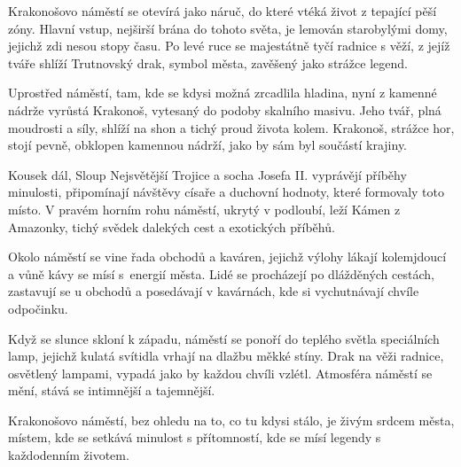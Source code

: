 \documentclass{article}
\begin{document}
	Krakonošovo náměstí se otevírá jako náruč, do které vtéká život z tepající pěší zóny. Hlavní vstup, nejširší brána do tohoto světa, je lemován starobylými domy, jejichž zdi nesou stopy času.
	Po levé ruce se majestátně tyčí radnice s věží, z jejíž tváře shlíží Trutnovský drak, symbol města, zavěšený jako strážce legend. \par
	Uprostřed náměstí, tam, kde se kdysi možná zrcadlila hladina, nyní z kamenné nádrže vyrůstá Krakonoš, vytesaný do podoby skalního masivu.
	Jeho tvář, plná moudrosti a síly, shlíží na shon a tichý proud života kolem. Krakonoš, strážce hor, stojí pevně, obklopen kamennou nádrží, jako by sám byl součástí krajiny. \par
	Kousek dál, Sloup Nejsvětější Trojice a socha Josefa II. vyprávějí příběhy minulosti, připomínají návštěvy císaře a duchovní hodnoty, které formovaly toto místo.
	V pravém horním rohu náměstí, ukrytý v podloubí, leží Kámen z Amazonky, tichý svědek dalekých cest a exotických příběhů. \par
	Okolo náměstí se vine řada obchodů a kaváren, jejichž výlohy lákají kolemjdoucí a vůně kávy se mísí s~energií města.
	Lidé se procházejí po dlážděných cestách, zastavují se u obchodů a posedávají v kavárnách, kde si vychutnávají chvíle odpočinku. \par
	Když se slunce skloní k západu, náměstí se ponoří do teplého světla speciálních lamp, jejichž kulatá svítidla vrhají na dlažbu měkké stíny. Drak na věži radnice, osvětlený lampami, vypadá jako by každou chvíli vzlétl.
	Atmosféra náměstí se mění, stává se intimnější a tajemnější. \par
	Krakonošovo náměstí, bez ohledu na to, co tu kdysi stálo, je živým srdcem města, místem, kde se setkává minulost s přítomností, kde se mísí legendy s každodenním životem.
\end{document}
